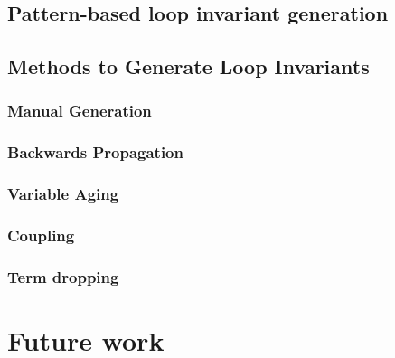 \cite{dafny-started}
\cite{dafny-lang}
\cite{dafny-mech}

\subsection{Pattern-based loop invariant generation}

\cite{pattern-loop-inv}

\subsection{Methods to Generate Loop Invariants}

\subsubsection{Manual Generation}

\cite{broda-loop-tech}

\subsubsection{Backwards Propagation}

\cite{infer-postconditions}
\cite{infer-dynamic}

\subsubsection{Variable Aging}

\cite{infer-postconditions}
\cite{infer-dynamic}

\subsubsection{Coupling}

\cite{infer-postconditions}
\cite{infer-dynamic}

\subsubsection{Term dropping}

\cite{infer-postconditions}
\cite{infer-dynamic}

\cite{struct-induction}


\section{Future work}

